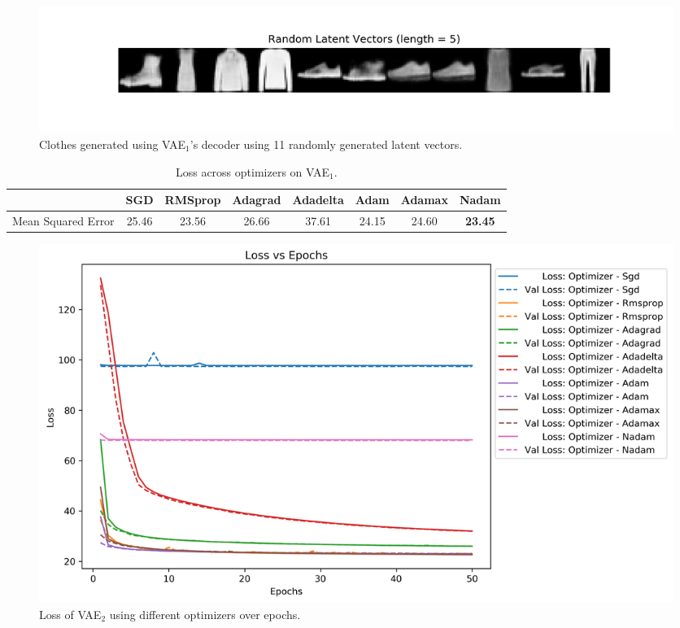 \documentclass[12pt]{article}
\begin{document}
\begin{figure}
  \centering
  \includegraphics[width=\linewidth]{task_5_clothes_kernel_3_kernels_16_latent_5_examples.png}
  \caption{Clothes generated using VAE$_1$'s decoder using 11 randomly generated latent vectors.}
  \label{fig:task_5_clothes_kernel_3_kernels_16_latent_5_examples}
\end{figure}

\begin{table}[]
  \centering
  \caption{Loss across optimizers on VAE$_1$.}
  \label{tab:VAE_1}
  \begin{tabular}{|c|c|c|c|c|c|c|c|}
  \hline
   & SGD & RMSprop & Adagrad & Adadelta & Adam & Adamax & Nadam \\ \hline
  Mean Squared Error & 25.46 & 23.56 & 26.66 & 37.61 & 24.15 & 24.60 & \textbf{23.45} \\ \hline
  \end{tabular}
  \end{table}

  \begin{figure}
    \centering
    \includegraphics[width=\linewidth]{task_5_loss_epochs_2.png}
    \caption{Loss of VAE$_2$ using different optimizers over epochs.}
    \label{fig:task_5_loss_epochs_2}
  \end{figure}
\end{document}
